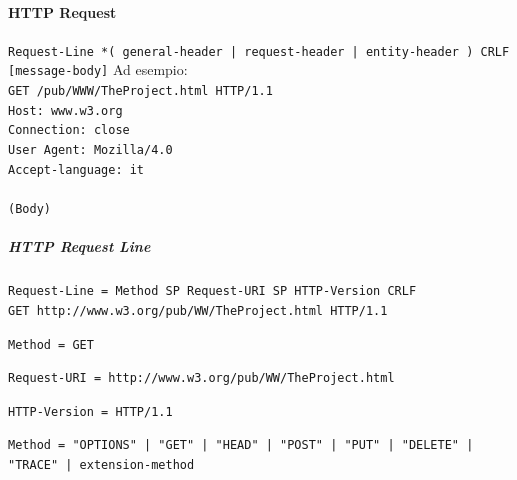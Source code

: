 \documentclass[10pt]{article}
\begin{document}
\paragraph{HTTP Request} \texttt{Request-Line *( general-header | request-header | entity-header ) CRLF [message-body]}
Ad esempio:\\
\texttt{GET /pub/WWW/TheProject.html HTTP/1.1\\
Host: www.w3.org\\
Connection: close\\
User Agent: Mozilla/4.0\\
Accept-language: it\\\\
(Body)}
\subparagraph{HTTP Request Line} \texttt{Request-Line = Method SP Request-URI SP HTTP-Version CRLF}\\\texttt{GET http://www.w3.org/pub/WW/TheProject.html HTTP/1.1}
\begin{list}{}{}
\item \texttt{Method = GET}
\item \texttt{Request-URI = http://www.w3.org/pub/WW/TheProject.html}
\item \texttt{HTTP-Version = HTTP/1.1}
\end{list}
\texttt{Method = "OPTIONS" | "GET" | "HEAD" | "POST" | "PUT" | "DELETE" | "TRACE" | extension-method}\\
\end{document}
